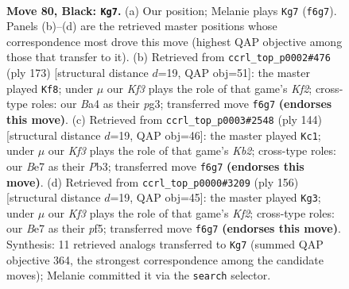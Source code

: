 \documentclass[11pt]{article}
\begin{document}
\clearpage

\begin{figure}[p]\centering
\begin{subfigure}{0.46\textwidth}\centering
\resizebox{\linewidth}{!}{%
\newchessgame
\chessboard[
  setfen={8/4b3/P4k1R/5p2/b4P2/8/3r4/6K1 b - - 5 80},
  showmover=false,
  pgfstyle=straightmove, color=movearrow, markmove={f6-g7}
]}
\caption{}
\end{subfigure}\hfill
\begin{subfigure}{0.46\textwidth}\centering
\resizebox{\linewidth}{!}{%
\newchessgame
\chessboard[
  setfen={8/2R2k2/4bp2/6pp/8/6P1/5K2/8 b - - 9 87},
  showmover=false,
  pgfstyle=straightmove, color=movearrow, markmove={f7-f8}
]}
\caption{}
\end{subfigure}
\\[4pt]
\begin{subfigure}{0.46\textwidth}\centering
\resizebox{\linewidth}{!}{%
\newchessgame
\chessboard[
  setfen={6R1/2k5/8/2p5/3p4/1P6/1K2r3/8 w - - 18 73},
  showmover=false,
  pgfstyle=straightmove, color=movearrow, markmove={b2-c1}
]}
\caption{}
\end{subfigure}\hfill
\begin{subfigure}{0.46\textwidth}\centering
\resizebox{\linewidth}{!}{%
\newchessgame
\chessboard[
  setfen={8/5k2/R7/5pp1/8/5P2/2r2K2/8 w - - 19 79},
  showmover=false,
  pgfstyle=straightmove, color=movearrow, markmove={f2-g3}
]}
\caption{}
\end{subfigure}
\caption{\textbf{Move 80, Black: \texttt{Kg7}.} (a) Our position; Melanie plays \texttt{Kg7} (\texttt{f6g7}). Panels (b)--(d) are the retrieved master positions whose correspondence most drove this move (highest QAP objective among those that transfer to it). (b) Retrieved from \texttt{ccrl\_top\_p0002\#476} (ply 173) [structural distance $d$=19, QAP obj=51]: the master played \texttt{Kf8}; under $\mu$ our \emph{Kf3} plays the role of that game's \emph{Kf2}; cross-type roles: our \emph{B}a4 as their \emph{p}g3; transferred move \texttt{f6g7} \textbf{(endorses this move)}. (c) Retrieved from \texttt{ccrl\_top\_p0003\#2548} (ply 144) [structural distance $d$=19, QAP obj=46]: the master played \texttt{Kc1}; under $\mu$ our \emph{Kf3} plays the role of that game's \emph{Kb2}; cross-type roles: our \emph{B}e7 as their \emph{P}b3; transferred move \texttt{f6g7} \textbf{(endorses this move)}. (d) Retrieved from \texttt{ccrl\_top\_p0000\#3209} (ply 156) [structural distance $d$=19, QAP obj=45]: the master played \texttt{Kg3}; under $\mu$ our \emph{Kf3} plays the role of that game's \emph{Kf2}; cross-type roles: our \emph{B}e7 as their \emph{p}f5; transferred move \texttt{f6g7} \textbf{(endorses this move)}. Synthesis: 11 retrieved analogs transferred to \texttt{Kg7} (summed QAP objective 364, the strongest correspondence among the candidate moves); Melanie committed it via the \texttt{search} selector.}
\label{fig:thought-m159}
\end{figure}
\end{document}
